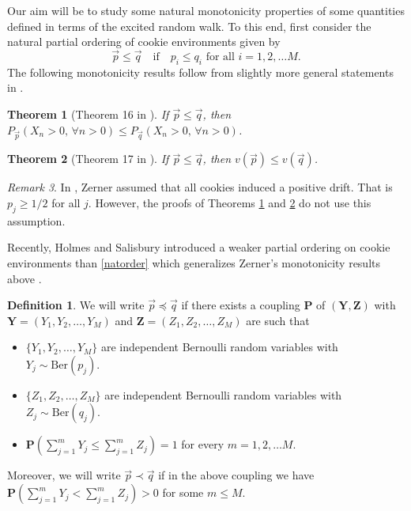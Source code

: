 \documentclass[reqno,letterpaper,11pt]{amsart}
\newtheorem{thm}{Theorem}[section]
\theoremstyle{remark}
\newtheorem{rem}[thm]{Remark}
\theoremstyle{definition}
\newtheorem{defn}{Definition}
\begin{document}
Our aim will be to study some natural monotonicity properties of some quantities defined in terms of the excited random walk. To this end, first consider the natural partial ordering of cookie environments given by 
\begin{equation}\label{natorder}
 \vec{p} \leq \vec{q} \quad\text{if} \quad p_i \leq q_i \text{ for all } i=1,2,\ldots M. 
\end{equation}
The following monotonicity results follow from slightly more general statements in \cite{zMERW}.
\begin{thm}[Theorem 16 in \cite{zMERW}]\label{zTransmono}
 If $\vec{p} \leq \vec{q}$, then $P_{\vec{p}}( X_n > 0, \, \forall n>0) \leq P_{\vec{q}}( X_n > 0, \, \forall n>0)$. 
\end{thm}

\begin{thm}[Theorem 17 in \cite{zMERW}]\label{zSpeedmono}
 If $\vec{p} \leq \vec{q}$, then $v({\vec{p}}) \leq v({\vec{q}})$.
\end{thm}

\begin{rem}
In \cite{zMERW}, Zerner assumed that all cookies induced a positive drift. That is $p_j\geq 1/2$ for all $j$. However, the proofs of Theorems \ref{zTransmono} and \ref{zSpeedmono} do not use this assumption.  
\end{rem}

Recently, Holmes and Salisbury introduced a weaker partial ordering on cookie environments than \eqref{natorder} which generalizes Zerner's monotonicity results above \cite{hsCombinatorial}. 

\begin{defn}
 We will write ${\vec{p}} {\preccurlyeq} {\vec{q}}$ if there exists a coupling ${\mathbf{P}}$ of  $(\mathbf{Y}, \mathbf{Z})$ with $\mathbf{Y} = (Y_1,Y_2,\ldots,Y_M)$ and $\mathbf{Z} = (Z_1, Z_2,\ldots,Z_M)$ are such that 
\begin{itemize}
 \item $\{Y_1,Y_2,\ldots, Y_M\}$ are independent Bernoulli random variables with $Y_j \sim \text{Ber}(p_j)$. 
 \item $\{Z_1,Z_2,\ldots, Z_M\}$ are independent Bernoulli random variables with $Z_j \sim \text{Ber}(q_j)$. 
 \item ${\mathbf{P}}\left( \sum_{j=1}^m Y_j \leq \sum_{j=1}^m Z_j \right) = 1$ for every $m=1,2,\ldots M$.
\end{itemize}
Moreover, we will write ${\vec{p}} \prec {\vec{q}}$ if in the above coupling we have ${\mathbf{P}}\left( \sum_{j=1}^m Y_j < \sum_{j=1}^m Z_j \right) > 0$ for some $m \leq M$. 
\end{defn}
\end{document}
